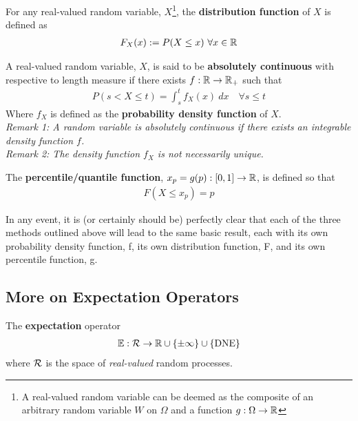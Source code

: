\documentclass{article}
\begin{document}
   	\begin{definition}
   		For any real-valued random variable, $X$\footnote{A real-valued random variable can be deemed as the composite of an arbitrary random variable $W$ on $\Omega$ and a function $g: \Omega \to \mathbb{R}$}, the \textbf{distribution function} of $X$ is defined as
   		\begin{align}
   			F_X(x) := P(X \leq x)\ \forall x \in \mathbb{R}
   		\end{align}
   	\end{definition}
   	
   	\begin{definition}
   		A real-valued random variable, $X$, is said to be \textbf{absolutely continuous} with respective to length measure if there exists $f: \mathbb{R} \to \mathbb{R}_+$ such that
   		\begin{align}
   			P(s < X \leq t) = \int_s^t f_X(x)\ dx\quad \forall s \leq t
   		\end{align}
   		Where $f_X$ is defined as the \textbf{probability density function} of $X$. \\
   		\emph{Remark 1: A random variable is absolutely continuous if there exists an integrable density function $f$.} \\
   		\emph{Remark 2: The density function $f_X$ is not necessarily unique.}
   	\end{definition}
   	
   	\begin{definition}
   		The \textbf{percentile/quantile function}, $x_p = g(p): [0, 1] \to \mathbb{R}$, is defined so that
   		\begin{align}
   			F(X \leq x_p) = p
   		\end{align}
   	\end{definition}
   	
   	\begin{remark}
   		In any event, it is (or certainly should be) perfectly clear that each of the three methods outlined above will lead to the same basic result, each with its own probability density function, f, its own distribution function, F, and its own percentile function, g.
   	\end{remark}
   	
   	\subsection{More on Expectation Operators}
   	
   	\begin{remark}
   		The \textbf{expectation} operator
   		\begin{align}
   			\mathbb{E}: \mathcal{{R}} \to \mathbb{R} \cup \{\pm\infty\} \cup \{ \text{{DNE}} \}
   		\end{align}
   		where $\mathcal{{R}}$ is the space of \emph{real-valued} random processes.
   	\end{remark}
   	
\end{document}
